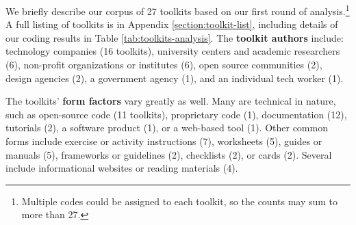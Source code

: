 \documentclass[acmsmall]{acmart}
\begin{document}
We briefly describe our corpus of 27 toolkits based on our first round of analysis.\footnote{Multiple codes could be assigned to each toolkit, so the counts may sum to more than 27.}
A full listing of toolkits is in Appendix \ref{section:toolkit-list}, including details of our coding results in Table \ref{tab:toolkits-analysis}. %
The \textbf{toolkit authors} include: technology companies (16 toolkits), university centers and academic researchers (6), non-profit organizations or institutes (6), open source communities (2), design agencies (2), a government agency (1), and an individual tech worker (1). 

The toolkits' \textbf{form factors} vary greatly as well. Many are technical in nature, such as open-source code (11 toolkits), proprietary code (1), documentation (12), tutorials (2), a software product (1), or a web-based tool (1). Other common forms include exercise or activity instructions (7), worksheets (5), guides or manuals (5), frameworks or guidelines (2), checklists (2), or cards (2). Several include informational websites or reading materials (4). 
\end{document}
